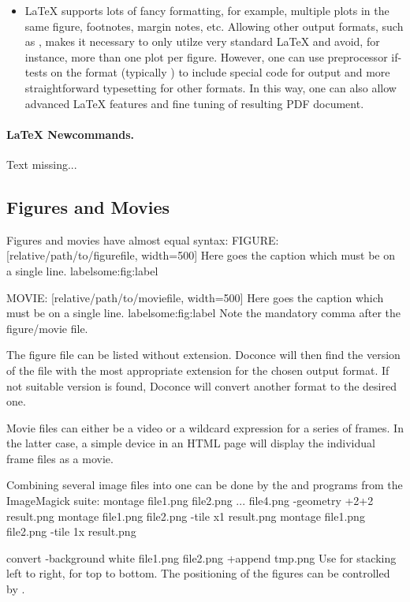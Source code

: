 \documentclass{book}
\begin{document}
{\begin{itemize}
  \item {\LaTeX} supports lots of fancy formatting, for example, multiple
    plots in the same figure, footnotes, margin notes, etc.
    Allowing other output formats, such as , makes it necessary
    to only utilze very standard {\LaTeX} and avoid, for instance, more than
    one plot per figure. However, one can use preprocessor if-tests on
    the format (typically ) to
    include special code for  output and more straightforward
    typesetting for other formats. In this way, one can also allow
    advanced {\LaTeX} features and fine tuning of resulting PDF document.
\end{itemize}

\noindent
\paragraph{LaTeX Newcommands.}
Text missing...

\subsection{Figures and Movies}

Figures and movies have almost equal syntax:
\bccq
FIGURE: [relative/path/to/figurefile, width=500] Here goes the caption which must be on a single line. label{some:fig:label}

MOVIE: [relative/path/to/moviefile, width=500] Here goes the caption which must be on a single line. label{some:fig:label}
\eccq
Note the mandatory comma after the figure/movie file.

The figure file can be listed without extension. Doconce will then find
the version of the file with the most appropriate extension for the chosen
output format. If not suitable version is found, Doconce will convert
another format to the desired one.

Movie files can either be a video or a wildcard expression for a
series of frames. In the latter case, a simple device in an HTML page
will display the individual frame files as a movie.

Combining several image files into one can be done by the
 and  programs from the ImageMagick suite:
\bsys
montage file1.png file2.png ... file4.png -geometry +2+2  result.png
montage file1.png file2.png -tile x1 result.png
montage file1.png file2.png -tile 1x result.png

convert -background white file1.png file2.png +append tmp.png
\esys
Use  for stacking left to right,  for top to bottom.
The positioning of the figures can be controlled by .

}
\end{document}

